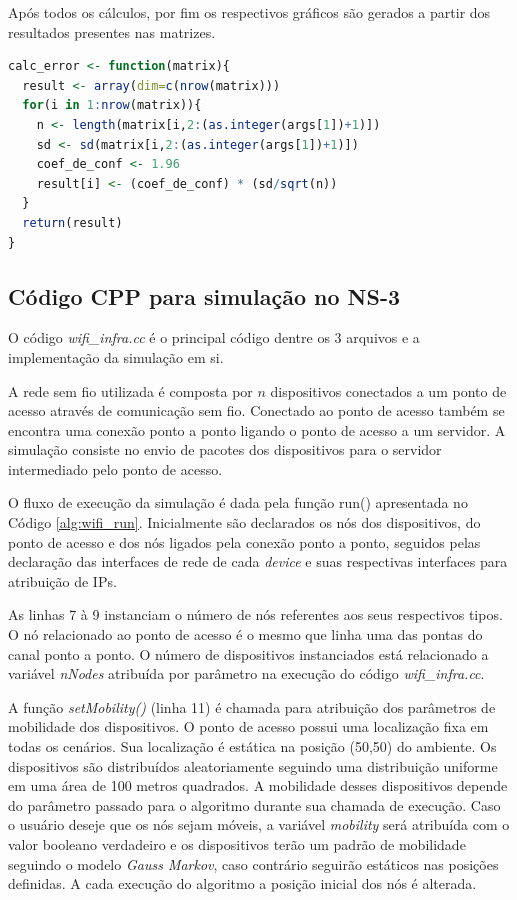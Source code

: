 \documentclass[12pt]{article}
\begin{document}
Após todos os cálculos, por fim os respectivos gráficos são gerados a partir dos resultados presentes nas matrizes.

\begin{lstlisting}[language=R, caption=Cálculo da taxa de erro para o intervalo de confiança, label=alg:taxa_de_erro_ic]
calc_error <- function(matrix){
  result <- array(dim=c(nrow(matrix)))
  for(i in 1:nrow(matrix)){
    n <- length(matrix[i,2:(as.integer(args[1])+1)])
    sd <- sd(matrix[i,2:(as.integer(args[1])+1)])
    coef_de_conf <- 1.96
    result[i] <- (coef_de_conf) * (sd/sqrt(n))
  }
  return(result)
}
\end{lstlisting}


\subsection{Código CPP para simulação no NS-3}

O código \textit{wifi\_infra.cc} é o principal código dentre os 3 arquivos e a implementação da simulação em si.

A rede sem fio utilizada é composta por $n$ dispositivos conectados a um ponto de acesso através de comunicação sem fio. Conectado ao ponto de acesso também se encontra uma conexão ponto a ponto ligando o ponto de acesso a um servidor. A simulação consiste no envio de pacotes dos dispositivos para o servidor intermediado pelo ponto de acesso.

O fluxo de execução da simulação é dada pela função run() apresentada no Código \ref{alg:wifi_run}. Inicialmente são declarados os nós dos dispositivos, do ponto de acesso e dos nós ligados pela conexão ponto a ponto, seguidos pelas declaração das interfaces de rede de cada \textit{device} e suas respectivas interfaces para atribuição de IPs.

As linhas 7 à 9 instanciam o número de nós referentes aos seus respectivos tipos. O nó relacionado ao ponto de acesso é o mesmo que linha uma das pontas do canal ponto a ponto. O número de dispositivos instanciados está relacionado a variável \textit{nNodes} atribuída por parâmetro na execução do código \textit{wifi\_infra.cc}.

A função \textit{setMobility()} (linha 11) é chamada para atribuição dos parâmetros de mobilidade dos dispositivos. O ponto de acesso possui uma localização fixa em todas os cenários. Sua localização é estática na posição (50,50) do ambiente. Os dispositivos são distribuídos aleatoriamente seguindo uma distribuição uniforme em uma área de 100 metros quadrados. A mobilidade desses dispositivos depende do parâmetro passado para o algoritmo durante sua chamada de execução. Caso o usuário deseje que os nós sejam móveis, a variável \textit{mobility} será atribuída com o  valor booleano verdadeiro e os dispositivos terão um padrão de mobilidade seguindo o modelo \textit{Gauss Markov}, caso contrário seguirão estáticos nas posições definidas. A cada execução do algoritmo a posição inicial dos nós é alterada.
\end{document}

